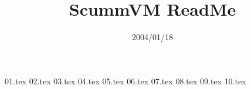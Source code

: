 \documentclass [a4paper,12pt]{article}
\title {ScummVM ReadMe}
\date {2004/01/18}
\begin{document}
%
\pagestyle {empty}
\fancyhf {}
\fancyhead [LE, RO] {\thepage}
\renewcommand {\headrulewidth} {1pt}
%
\maketitle
\newpage
\thispagestyle {empty}
\tableofcontents
%
\newpage
\pagestyle {fancy}
 {01.tex}
 {02.tex}
 {03.tex}
 {04.tex}
 {05.tex}
 {06.tex}
 {07.tex}
 {08.tex}
 {09.tex}
 {10.tex}
\end{document}
